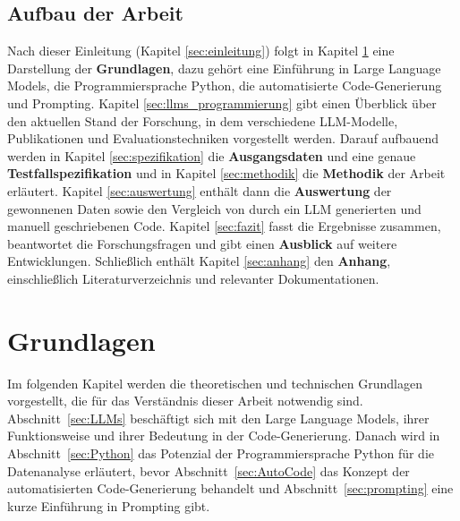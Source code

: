 \documentclass[11pt,a4paper]{article}
\begin{document}
\subsection{Aufbau der Arbeit}
Nach dieser Einleitung (Kapitel \ref{sec:einleitung}) folgt in Kapitel \ref{sec:grundlagen} eine Darstellung der \textbf{Grundlagen}, dazu gehört eine Einführung in Large Language Models, die Programmiersprache Python, die automatisierte Code-Generierung und Prompting. Kapitel \ref{sec:llms_programmierung} gibt einen Überblick über den aktuellen Stand der Forschung, in dem verschiedene LLM-Modelle, Publikationen und Evaluationstechniken vorgestellt werden. Darauf aufbauend werden in Kapitel \ref{sec:spezifikation} die \textbf{Ausgangsdaten} und eine genaue \textbf{Testfallspezifikation} und in Kapitel \ref{sec:methodik} die \textbf{Methodik} der Arbeit erläutert. Kapitel \ref{sec:auswertung} enthält dann die \textbf{Auswertung} der gewonnenen Daten sowie den Vergleich von durch ein LLM generierten und manuell geschriebenen Code. Kapitel \ref{sec:fazit} fasst die Ergebnisse zusammen, beantwortet die Forschungsfragen und gibt einen \textbf{Ausblick} auf weitere Entwicklungen. Schließlich enthält Kapitel \ref{sec:anhang} den \textbf{Anhang}, einschließlich Literaturverzeichnis und relevanter Dokumentationen.


\section{Grundlagen}
\label{sec:grundlagen}
Im folgenden Kapitel werden die theoretischen und technischen Grundlagen vorgestellt, die für das Verständnis dieser Arbeit notwendig sind. Abschnitt~\ref{sec:LLMs} beschäftigt sich mit den Large Language Models, ihrer Funktionsweise und ihrer Bedeutung in der Code-Generierung. Danach wird in Abschnitt~\ref{sec:Python} das Potenzial der Programmiersprache Python für die Datenanalyse erläutert, bevor Abschnitt~\ref{sec:AutoCode} das Konzept der automatisierten Code-Generierung behandelt und Abschnitt~\ref{sec:prompting} eine kurze Einführung in Prompting gibt.
\end{document}
